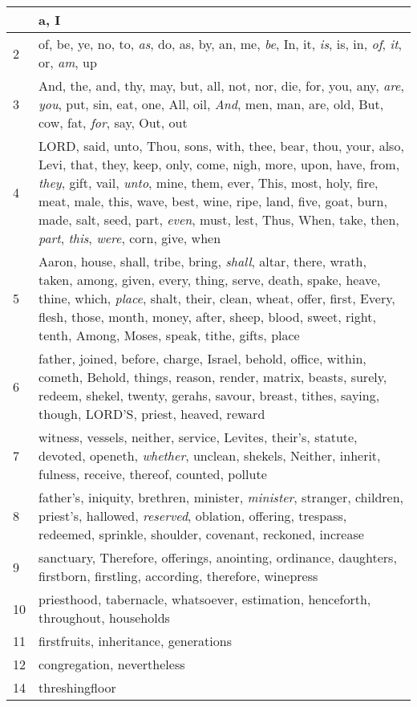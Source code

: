 \begin{longtable}{l|p{3.75in}}
\hline \hline
\endlastfoot
1 & a, I \\ \hline
2 & of, be, ye, no, to, \emph{as}, do, as, by, an, me, \emph{be}, In, it, \emph{is}, is, in, \emph{of}, \emph{it}, or, \emph{am}, up \\ \hline
3 & And, the, and, thy, may, but, all, not, nor, die, for, you, any, \emph{are}, \emph{you}, put, sin, eat, one, All, oil, \emph{And}, men, man, are, old, But, cow, fat, \emph{for}, say, Out, out \\ \hline
4 & LORD, said, unto, Thou, sons, with, thee, bear, thou, your, also, Levi, that, they, keep, only, come, nigh, more, upon, have, from, \emph{they}, gift, vail, \emph{unto}, mine, them, ever, This, most, holy, fire, meat, male, this, wave, best, wine, ripe, land, five, goat, burn, made, salt, seed, part, \emph{even}, must, lest, Thus, When, take, then, \emph{part}, \emph{this}, \emph{were}, corn, give, when \\ \hline
5 & Aaron, house, shall, tribe, bring, \emph{shall}, altar, there, wrath, taken, among, given, every, thing, serve, death, spake, heave, thine, which, \emph{place}, shalt, their, clean, wheat, offer, first, Every, flesh, those, month, money, after, sheep, blood, sweet, right, tenth, Among, Moses, speak, tithe, gifts, place \\ \hline
6 & father, joined, before, charge, Israel, behold, office, within, cometh, Behold, things, reason, render, matrix, beasts, surely, redeem, shekel, twenty, gerahs, savour, breast, tithes, saying, though, LORD'S, priest, heaved, reward \\ \hline
7 & witness, vessels, neither, service, Levites, their's, statute, devoted, openeth, \emph{whether}, unclean, shekels, Neither, inherit, fulness, receive, thereof, counted, pollute \\ \hline
8 & father's, iniquity, brethren, minister, \emph{minister}, stranger, children, priest's, hallowed, \emph{reserved}, oblation, offering, trespass, redeemed, sprinkle, shoulder, covenant, reckoned, increase \\ \hline
9 & sanctuary, Therefore, offerings, anointing, ordinance, daughters, firstborn, firstling, according, therefore, winepress \\ \hline
10 & priesthood, tabernacle, whatsoever, estimation, henceforth, throughout, households \\ \hline
11 & firstfruits, inheritance, generations \\ \hline
12 & congregation, nevertheless \\ \hline
14 & threshingfloor \\ \hline
\end{longtable}







